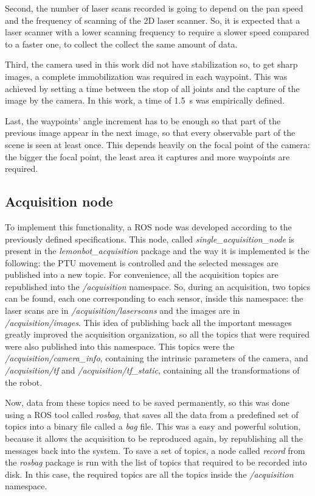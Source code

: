Second, the number of laser scans recorded is going to depend on the pan speed and the frequency of scanning of the 2D laser scanner. So, it is expected that a laser scanner with a lower scanning frequency to require a slower speed compared to a faster one, to collect the collect the same amount of data. 
                        
Third, the camera used in this work did not have stabilization so, to get sharp images, a complete immobilization was required in each waypoint. This was achieved by setting a time between the stop of all joints and the capture of the image by the camera. In this work, a time of \SI{1.5}{\second} was empirically defined.
                        
Last, the waypoints' angle increment has to be enough so that part of the previous image appear in the next image, so that every observable part of the scene is seen at least once. This depends heavily on the focal point of the camera: the bigger the focal point, the least area it captures and more waypoints are required.

\subsection{Acquisition node}
\label{section:acquisition-node}


To implement this functionality, a ROS node was developed according to the previously defined specifications. This node, called \emph{single\_acquisition\_node} is present in the \emph{lemonbot\_acquisition} package and the way it is implemented is the following: the PTU movement is controlled and the selected messages are published into a new topic. For convenience, all the acquisition topics are republished into the \emph{/acquisition} namespace. So, during an acquisition, two topics can be found, each one corresponding to each sensor, inside this namespace: the laser scans are in \emph{/acquisition/laserscans} and the images are in \emph{/acquisition/images}. This idea of publishing back all the important messages greatly improved the acquisition organization, so all the topics that were required were also published into this namespace. This topics were the \emph{/acquisition/camera\_info}, containing the intrinsic parameters of the camera, and \emph{/acquisition/tf} and \emph{/acquisition/tf\_static}, containing all the transformations of the robot.

Now, data from these topics need to be saved permanently, so this was done using a ROS tool called \emph{rosbag}, that saves all the data from a predefined set of topics into a binary file called a \emph{bag} file. This was a easy and powerful solution, because it allows the acquisition to be reproduced again, by republishing all the messages back into the system. To save a set of topics, a node called \emph{record} from the \emph{rosbag} package is run with the list of topics that required to be recorded into disk. In this case, the required topics are all the topics inside the \emph{/acquisition} namespace.

